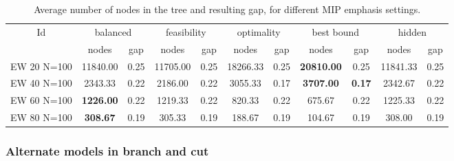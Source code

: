 \begin{sidewaystable}[h]
\label{table:bnc:emph}
\centering

\begin{tabular}{|c|cc|cc|cc|cc|cc|}
\hline
\multicolumn{1}{|c|}{Id} & \multicolumn{2}{|c|}{balanced} & \multicolumn{2}{|c|}{feasibility} & \multicolumn{2}{|c|}{optimality} & \multicolumn{2}{|c|}{best bound} & \multicolumn{2}{|c|}{hidden}
\\
 & nodes & gap & nodes & gap & nodes & gap & nodes & gap & nodes & gap
\\
\hline
EW 20 N=100 & 11840.00 & 0.25 & 11705.00 & 0.25 & 18266.33 & 0.25 & \textbf{20810.00} & 0.25 & 11841.33 & 0.25
\\
EW 40 N=100 & 2343.33 & 0.22 & 2186.00 & 0.22 & 3055.33 & 0.17 & \textbf{3707.00} & \textbf{0.17} & 2342.67 & 0.22
\\
EW 60 N=100 & \textbf{1226.00} & 0.22 & 1219.33 & 0.22 & 820.33 & 0.22 & 675.67 & 0.22 & 1225.33 & 0.22
\\
EW 80 N=100 & \textbf{308.67} & 0.19 & 305.33 & 0.19 & 188.67 & 0.19 & 104.67 & 0.19 & 308.00 & 0.19
\\
\hline 
\end{tabular}

 
\caption{Average number of nodes in the tree and resulting gap, for different MIP emphasis settings.}

\end{sidewaystable}

\clearpage

\subsubsection{Alternate models in branch and cut}

